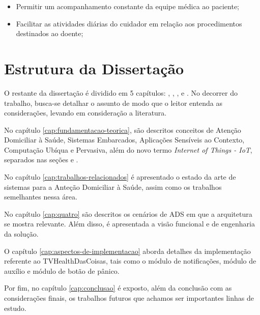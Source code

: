 \begin{itemize}
  \item Permitir um acompanhamento constante da equipe médica ao paciente;
  \item Facilitar as atividades diárias do cuidador em relação aos procedimentos
  destinados ao doente;
\end{itemize}

\section{Estrutura da Dissertação}\label{sec:estrutura}

O restante da dissertação é dividido em 5 capítulos: ,
, , 
e . No decorrer do trabalho, busca-se detalhar o assunto de modo que o
leitor entenda as considerações, levando em consideração a literatura. 

No capítulo \ref{cap:fundamentacao-teorica}, são descritos conceitos de Atenção
Domiciliar à Saúde, Sistemas Embarcados, Aplicações Sensíveis ao Contexto,
Computação Ubíqua e Pervasiva, além do novo termo \textit{Internet of Things -
IoT}, separados nas seções  e
.

No capítulo \ref{cap:trabalhos-relacionados} é apresentado o estado da arte de
sistemas para a Anteção Domiciliar à Saúde, assim como os trabalhos semelhantes
nessa área.

No capítulo \ref{cap:quatro} são descritos os cenários de ADS em que a arquitetura
se mostra relevante. Além disso, é apresentada a visão funcional e de engenharia
da solução.

O capítulo \ref{cap:aspectos-de-implementacao} aborda detalhes da implementação
referente ao TVHealthDasCoisas, tais como o módulo de notificações, módulo de 
auxílio e módulo de botão de pânico.

Por fim, no capítulo \ref{cap:conclusao} é exposto, além da conclusão com as 
considerações finais, os trabalhos futuros que achamos ser importantes linhas
de estudo.

